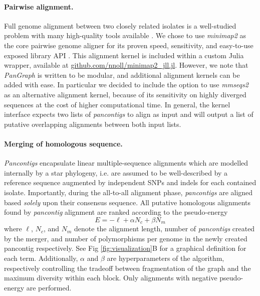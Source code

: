 \documentclass[aps,rmp,reprint,superscriptaddress,notitlepage,10pt]{revtex4-1}
\begin{document}
\paragraph{Pairwise alignment.}
Full genome alignment between two closely related isolates is a well-studied problem with many high-quality tools available \cite{li2018minimap2,marccais2018mummer4}.
We chose to use \emph{minimap2} as the core pairwise genome aligner for its proven speed, sensitivity, and easy-to-use exposed library API \cite{li2018minimap2}.
This alignment kernel is included within a custom Julia wrapper, available at \url{github.com/nnoll/minimap2_jll.jl}.
However, we note that \emph{PanGraph} is written to be modular, and additional alignment kernels can be added with ease.
In particular we decided to include the option to use \emph{mmseqs2} \cite{steinegger2017mmseqs2} as an alternative alignment kernel, because of its sensitivity on highly diverged sequences at the cost of higher computational time.
In general, the kernel interface expects two lists of \emph{pancontigs} to align as input and will output a list of putative overlapping alignments between both input lists.

\paragraph{Merging of homologous sequence.}
\emph{Pancontigs} encapsulate linear multiple-sequence alignments which are modelled internally by a star phylogeny, i.e. are assumed to be well-described by a reference sequence augmented by independent SNPs and indels for each contained isolate.
Importantly, during the all-to-all alignment phase, \emph{pancontigs} are aligned based \emph{solely} upon their consensus sequence.
All putative homologous alignments found by \emph{pancontig} alignment are ranked according to the pseudo-energy
\begin{equation}
    E = -\ell + \alpha N_c + \beta N_m
\end{equation}
where $\ell$, $N_c$, and $N_m$ denote the alignment length, number of \emph{pancontigs} created by the merger, and number of polymorphisms per genome in the newly created {pancontig} respectively.
See Fig \ref{fig:visualization}B for a graphical definition for each term.
Additionally, $\alpha$ and $\beta$ are hyperparameters of the algorithm, respectively controlling the tradeoff between fragmentation of the graph and the maximum diversity within each block.
Only alignments with negative pseudo-energy are performed.
\end{document}
